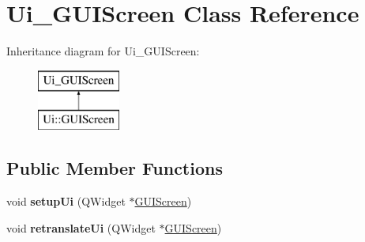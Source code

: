 \hypertarget{class_ui___g_u_i_screen}{}\section{Ui\+\_\+\+G\+U\+I\+Screen Class Reference}
\label{class_ui___g_u_i_screen}
Inheritance diagram for Ui\+\_\+\+G\+U\+I\+Screen\+:\begin{figure}[H]
\begin{center}
\leavevmode
\includegraphics[height=2.000000cm]{class_ui___g_u_i_screen}
\end{center}
\end{figure}
\subsection*{Public Member Functions}
\begin{DoxyCompactItemize}
\item 
\mbox{\label{class_ui___g_u_i_screen_a7ca728c75177f9a79e380e0635dfd24a}} 
void {\bfseries setup\+Ui} (Q\+Widget $\ast$\hyperlink{class_g_u_i_screen}{G\+U\+I\+Screen})
\item 
\mbox{\label{class_ui___g_u_i_screen_aab74d6cd64fdddbd9e5cfd77fbb96871}} 
void {\bfseries retranslate\+Ui} (Q\+Widget $\ast$\hyperlink{class_g_u_i_screen}{G\+U\+I\+Screen})
\end{DoxyCompactItemize}
